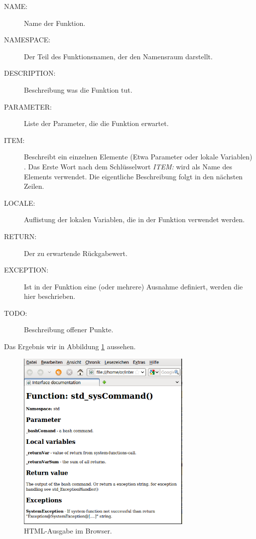 \documentclass[10pt,a4paper]{article}
\begin{document}
\begin{description}
 \item[NAME:] Name der Funktion.
 \item[NAMESPACE:] Der Teil des Funktionsnamen, der den Namensraum darstellt.
 \item[DESCRIPTION:] Beschreibung was die Funktion tut.
 \item[PARAMETER:] Liste der Parameter, die die Funktion erwartet.
 \item[ITEM:] Beschreibt ein einzelnen Elemente (Etwa Parameter oder lokale Variablen) . Das Erste Wort nach dem Schlüsselwort \textit{ITEM:} wird als Name des Elements verwendet. Die eigentliche Beschreibung folgt in den nächsten Zeilen. 
 \item[LOCALE:] Auflistung der lokalen Variablen, die in der Funktion verwendet werden.
 \item[RETURN:] Der zu erwartende Rückgabewert.
 \item[EXCEPTION:] Ist in der Funktion eine (oder mehrere) Ausnahme definiert, werden die hier beschrieben. 
 \item[TODO:] Beschreibung offener Punkte.
 \end{description}

\bigskip 
Das Ergebnis wir in Abbildung \ref{pic:html} aussehen.

\begin{figure}[H]
 \centering
 \includegraphics[width=0.75\textwidth]{./awk-html-conv.png}
 \caption[]{HTML-Ausgabe im Browser.}
 \label{pic:html}
\end{figure}
 
\end{document}
